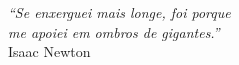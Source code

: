 \begin{epigrafe}
  \vspace*{\fill}
	\begin{flushright}
		\textit{``Se enxerguei mais longe, foi porque\\
        me apoiei em ombros de gigantes.''\\}
		Isaac Newton
	\end{flushright}
\end{epigrafe}
